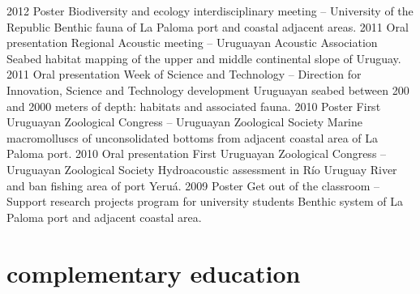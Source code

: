 \documentclass[]{friggeri-cv} %
\begin{document}
\begin{entrylist}	
	\entry
	{2012}
	{Poster}
	{Biodiversity and ecology interdisciplinary meeting -- University of the Republic}
	{Benthic fauna of La Paloma port and coastal adjacent areas.}
	\entry
	{2011}
	{Oral presentation}
	{Regional Acoustic meeting -- Uruguayan Acoustic Association}
	{Seabed habitat mapping of the upper and middle continental slope of Uruguay.}
	\entry
	{2011}
	{Oral presentation}
	{Week of Science and Technology -- Direction for Innovation, Science and Technology development}
	{Uruguayan seabed between 200 and 2000 meters of depth: habitats and associated fauna.}
	\entry
	{2010}
	{Poster}
	{First Uruguayan Zoological Congress -- Uruguayan Zoological Society}
	{Marine macromolluscs of unconsolidated bottoms from adjacent coastal area of La Paloma port.}
	\entry
	{2010}
	{Oral presentation}
	{First Uruguayan Zoological Congress -- Uruguayan Zoological Society}
	{Hydroacoustic assessment in Río Uruguay River and ban fishing area of port Yeruá.}
	\entry
	{2009}
	{Poster}
	{Get out of the classroom -- Support research projects program for university students}
	{Benthic system of La Paloma port and adjacent coastal area.}	
\end{entrylist}

\section{complementary education}
\end{document}
